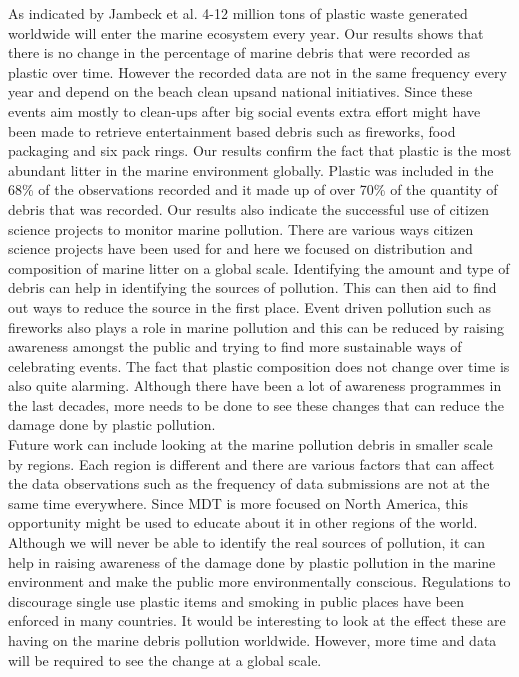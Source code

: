 \documentclass[10pt]{article}\usepackage[]{graphicx}\usepackage[]{color}
\begin{document}
As indicated by Jambeck et al.\cite{JAMBECK2015} 4-12 million tons of plastic waste generated worldwide will enter the marine ecosystem every year. Our results shows that there is no change in the percentage of marine debris that were recorded as plastic over time. However the recorded data are not in the same frequency every year and depend on the beach clean upsand national initiatives. Since these events aim mostly to clean-ups after big social events extra effort might have been made to retrieve entertainment based debris such as fireworks, food packaging and six pack rings. Our results confirm the fact that plastic is the most abundant litter in the marine environment globally. Plastic was included in the 68\% of the observations recorded and it made up of over 70\% of the quantity of debris that was recorded. Our results also indicate the successful use of citizen science projects to monitor marine pollution. There are various ways citizen science projects have been used for and here we focused on distribution and composition of marine litter on a global scale. Identifying the amount and type of debris can help in identifying the sources of pollution. This can then aid to find out ways to reduce the source in the first place. Event driven pollution such as fireworks also plays a role in marine pollution and this can be reduced by raising awareness amongst the public and trying to find more sustainable ways of celebrating events. The fact that plastic composition does not change over time is also quite alarming. Although there have been a lot of awareness programmes in the last decades, more needs to be done to see these changes that can reduce the damage done by plastic pollution.  \\
Future work can include looking at the marine pollution debris in smaller scale by regions. Each region is different and there are various factors that can affect the data observations such as the frequency of data submissions are not at the same time everywhere.  Since MDT is more focused on North America, this opportunity might be used to educate about it in other regions of the world. Although we will never be able to identify the real sources of pollution, it can help in raising awareness of the damage done by plastic pollution in the marine environment and make the public more environmentally conscious. Regulations to discourage single use plastic items and smoking in public places have been enforced in many countries. It would be interesting to look at the effect these are having on the marine debris pollution worldwide. However, more time and data will be required to see the change at a global scale. \\
\end{document}
